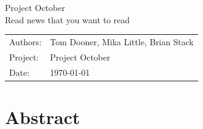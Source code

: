 \documentclass[11pt,letterpaper]{article}
\begin{document}

\newpage
\pagestyle{fancy}
\fancyhf{}
\vspace*{6cm}
\begin{center}
\Huge  {Project October}\\
\vspace{1cm}
\huge {Read news that you want to read}\\
\vspace{1cm}
\end{center}
\vfill
\begin{flushright}
\begin{tabular}{ll}
Authors: & Tom Dooner, Mika Little, Brian Stack\\
Project: & Project October\\
Date: & \today
\end{tabular}
\end{flushright}

\newpage
\pagestyle{fancy}
\fancyhf{}

\fancyhead[L]{\small \rm \textit{\rightmark}}
\fancyhead[R]{\small \rm \textbf{\thepage}}



\renewcommand{\sectionmark}[1]{\markright{\thesection.\ #1}}
\renewcommand{\headrulewidth}{0.5pt}
\renewcommand{\footrulewidth}{0.5pt}


\tableofcontents
\listoffigures

\newpage
\section{Abstract}
\end{document}
